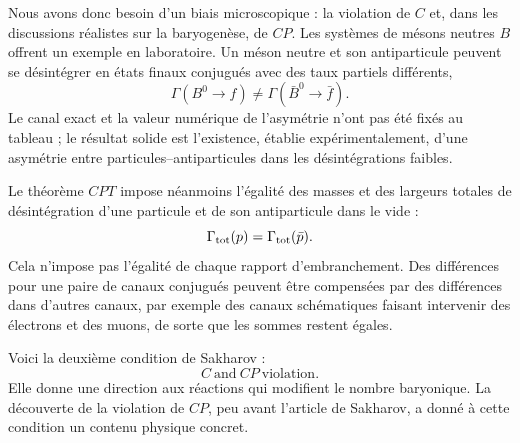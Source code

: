 Nous avons donc besoin d’un biais microscopique : la violation de \(C\) et, dans les discussions réalistes sur la baryogenèse, de \(CP\). Les systèmes de mésons neutres \(B\) offrent un exemple en laboratoire. Un méson neutre et son antiparticule peuvent se désintégrer en états finaux conjugués avec des taux partiels différents,
\begin{equation}
\Gamma(B^0\to f)\ne\Gamma(\bar B^0\to\bar f).
\label{eq:c08-cp-partial}
\end{equation}
Le canal exact et la valeur numérique de l’asymétrie n’ont pas été fixés au tableau ; le résultat solide est l’existence, établie expérimentalement, d’une asymétrie entre particules--antiparticules dans les désintégrations faibles.

Le théorème \(CPT\) impose néanmoins l’égalité des masses et des largeurs totales de désintégration d’une particule et de son antiparticule dans le vide :
\begin{equation}
\Gamma_{\rm tot}(p)=\Gamma_{\rm tot}(\bar p).
\end{equation}
Cela n’impose pas l’égalité de chaque rapport d’embranchement. Des différences pour une paire de canaux conjugués peuvent être compensées par des différences dans d’autres canaux, par exemple des canaux schématiques faisant intervenir des électrons et des muons, de sorte que les sommes restent égales.

\begin{classroomqa}
\end{classroomqa}

Voici la deuxième condition de Sakharov :
\begin{equation}
\boxed{C\ \text{and}\ CP\ \text{violation}.}
\end{equation}
Elle donne une direction aux réactions qui modifient le nombre baryonique. La découverte de la violation de \(CP\), peu avant l’article de Sakharov, a donné à cette condition un contenu physique concret.

